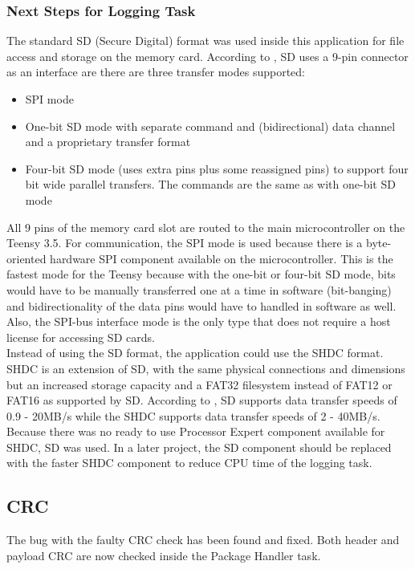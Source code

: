 \subsubsection{Next Steps for Logging Task}
The standard SD (Secure Digital) format was used inside this application for file access and storage on the memory card. According to \cite{SD_Wikipedia}, SD uses a 9-pin connector as an interface are there are three transfer modes supported:\begin{itemize}
    \item SPI mode 
    \item One-bit SD mode with separate command and (bidirectional) data channel and a proprietary transfer format
    \item Four-bit SD mode (uses extra pins plus some reassigned pins) to support four bit wide parallel transfers. The commands are the same as with one-bit SD mode
\end{itemize}
All 9 pins of the memory card slot are routed to the main microcontroller on the Teensy 3.5. For communication, the SPI mode is used because there is a byte-oriented hardware SPI component available on the microcontroller. This is the fastest mode for the Teensy because with the one-bit or four-bit SD mode, bits would have to be manually transferred one at a time in software (bit-banging) and bidirectionality of the data pins would have to handled in software as well.\\
Also, the SPI-bus interface mode is the only type that does not require a host license for accessing SD cards.\\
Instead of using the SD format, the application could use the SHDC format. SHDC is an extension of SD, with the same physical connections and dimensions but an increased storage capacity and a FAT32 filesystem instead of FAT12 or FAT16 as supported by SD. According to \cite{SD_SiliconLabs}, SD supports data transfer speeds of 0.9 - 20MB/s while the SHDC supports data transfer speeds of 2 - 40MB/s.\\
Because there was no ready to use Processor Expert component available for SHDC, SD was used. In a later project, the SD component should be replaced with the faster SHDC component to reduce CPU time of the logging task.
%
\subsection{CRC}
The bug with the faulty CRC check has been found and fixed. Both header and payload CRC are now checked inside the Package Handler task.
%
